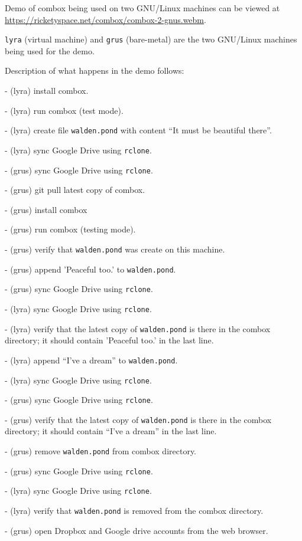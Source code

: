 Demo of combox being used on two GNU/Linux machines can be viewed at
\url{https://ricketyspace.net/combox/combox-2-gnus.webm}.

\verb+lyra+ (virtual machine) and \verb+grus+ (bare-metal) are the two
GNU/Linux machines being used for the demo.

Description of what happens in the demo follows:

 - (lyra) install combox.

 - (lyra) run combox (test mode).

 - (lyra) create file \verb+walden.pond+ with content ``It must be
 beautiful there''.

 - (lyra) sync Google Drive using \verb+rclone+.

 - (grus) sync Google Drive using \verb+rclone+.

 - (grus) git pull latest copy of combox.

 - (grus) install combox 

 - (grus) run combox (testing mode).

 - (grus) verify that \verb+walden.pond+ was create on this machine.

 - (grus) append 'Peaceful too.' to \verb+walden.pond+.

 - (grus) sync Google Drive using \verb+rclone+.

 - (lyra) sync Google Drive using \verb+rclone+.

 - (lyra) verify that the latest copy of \verb+walden.pond+ is there
 in the combox directory; it should contain 'Peaceful too.' in the
 last line.

 - (lyra) append ``I've a dream'' to \verb+walden.pond+.

 - (lyra) sync Google Drive using \verb+rclone+.

 - (grus) sync Google Drive using \verb+rclone+.

 - (grus) verify that the latest copy of \verb+walden.pond+ is there
 in the combox directory; it should contain ``I've a dream'' in the
 last line.

 - (grus) remove \verb+walden.pond+ from combox directory.

 - (grus) sync Google Drive using \verb+rclone+.

 - (lyra) sync Google Drive using \verb+rclone+.

 - (lyra) verify that \verb+walden.pond+ is removed from the combox
 directory.

 - (grus) open Dropbox and Google drive accounts from the web browser.

